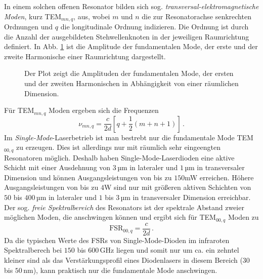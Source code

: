 In einem solchen offenen Resonator bilden sich sog.
\textit{transversal-elektromagnetische Moden}, kurz TEM$_{mn,q}$, aus, wobei $m$
und $n$ die zur Resonatorachse senkrechten Ordnungen und $q$ die longitudinale
Ordnung indizieren. Die Ordnung ist durch die Anzahl der ausgebildeten
Stehwellenknoten in der jeweiligen Raumrichtung definiert. In
Abb. \ref{fig:TEM-moden} ist die Amplitude der fundamentalen Mode, der erste und
der zweite Harmonische einer Raumrichtung dargestellt.
\begin{figure}[h]
	\centering
	\footnotesize
	
	\caption[räumliche Moden im Resonator]{Der Plot zeigt die Amplituden der
	fundamentalen Mode, der ersten und der zweiten Harmonischen in Abhängigkeit von einer
	räumlichen Dimension.}\label{fig:TEM-moden}
\end{figure}
Für TEM$_{mn,q}$ Moden ergeben sich die Frequenzen
\begin{equation}\label{eq:TEM-moden_frequenz}
	\nu_{mn,q}=\frac{c}{2d}\left[q+\frac{1}{2}(m+n+1)\right]\,.
\end{equation}
Im \textit{Single-Mode}-Laserbetrieb ist man bestrebt nur die fundamentale Mode
TEM$_{00,q}$ zu erzeugen. Dies ist allerdings nur mit räumlich sehr eingeengten
Resonatoren möglich. Deshalb haben Single-Mode-Laserdioden eine aktive
Schicht mit einer Ausdehnung von $3\,$µm in lateraler und $1\,$µm in
transversaler Dimension und können Ausgangsleistungen von bis zu $150$mW erreichen. Höhere
Ausgangsleistungen von bis zu $4$W sind nur mit größeren aktiven Schichten von
$50$ bis $400\,$µm in lateraler und $1$ bis $3\,$µm in transversaler Dimension
erreichbar.
Der sog. \textit{freie Spektralbereich} des Resonators ist der spektrale Abstand
zweier möglichen Moden, die anschwingen können und ergibt sich für TEM$_{00,q}$
Moden zu
\begin{equation}\label{eq:FSR_TEM-moden}
	\text{FSR}_{00,q}=\frac{c}{2d}\,.
\end{equation}
Da die typischen Werte des FSRs von Single-Mode-Dioden im infraroten
Spektralberech bei $150$ bis $600\,$GHz liegen und somit nur um ca. ein zehntel
kleiner sind als das Verstärkungsprofil eines Diodenlasers in diesem Bereich
($30$ bis $50\,$nm), kann praktisch nur die fundamentale Mode anschwingen.


